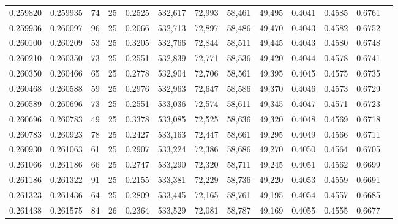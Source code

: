 \begin{tabular}{rrrrrrrrrrrrr}
0.259820 & 0.259935 &    74 &  25 &                                     0.2525 & 532,617 &  72,993 &  58,461 &  49,495 & 0.4041 & 0.4585 & 0.6761 \\
0.259936 & 0.260097 &    96 &  25 &                                     0.2066 & 532,713 &  72,897 &  58,486 &  49,470 & 0.4043 & 0.4582 & 0.6752 \\
0.260100 & 0.260209 &    53 &  25 &                                     0.3205 & 532,766 &  72,844 &  58,511 &  49,445 & 0.4043 & 0.4580 & 0.6748 \\
0.260210 & 0.260350 &    73 &  25 &                                     0.2551 & 532,839 &  72,771 &  58,536 &  49,420 & 0.4044 & 0.4578 & 0.6741 \\
0.260350 & 0.260466 &    65 &  25 &                                     0.2778 & 532,904 &  72,706 &  58,561 &  49,395 & 0.4045 & 0.4575 & 0.6735 \\
0.260468 & 0.260588 &    59 &  25 &                                     0.2976 & 532,963 &  72,647 &  58,586 &  49,370 & 0.4046 & 0.4573 & 0.6729 \\
0.260589 & 0.260696 &    73 &  25 &                                     0.2551 & 533,036 &  72,574 &  58,611 &  49,345 & 0.4047 & 0.4571 & 0.6723 \\
0.260696 & 0.260783 &    49 &  25 &                                     0.3378 & 533,085 &  72,525 &  58,636 &  49,320 & 0.4048 & 0.4569 & 0.6718 \\
0.260783 & 0.260923 &    78 &  25 &                                     0.2427 & 533,163 &  72,447 &  58,661 &  49,295 & 0.4049 & 0.4566 & 0.6711 \\
0.260930 & 0.261063 &    61 &  25 &                                     0.2907 & 533,224 &  72,386 &  58,686 &  49,270 & 0.4050 & 0.4564 & 0.6705 \\
0.261066 & 0.261186 &    66 &  25 &                                     0.2747 & 533,290 &  72,320 &  58,711 &  49,245 & 0.4051 & 0.4562 & 0.6699 \\
0.261186 & 0.261322 &    91 &  25 &                                     0.2155 & 533,381 &  72,229 &  58,736 &  49,220 & 0.4053 & 0.4559 & 0.6691 \\
0.261323 & 0.261436 &    64 &  25 &                                     0.2809 & 533,445 &  72,165 &  58,761 &  49,195 & 0.4054 & 0.4557 & 0.6685 \\
0.261438 & 0.261575 &    84 &  26 &                                     0.2364 & 533,529 &  72,081 &  58,787 &  49,169 & 0.4055 & 0.4555 & 0.6677 \\

\end{tabular}
